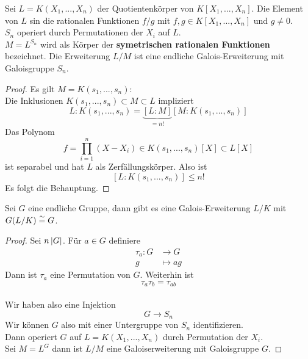 	\begin{definition}
		Sei $L=K(X_1,...,X_n)$ der Quotientenkörper von $K[X_1,...,X_n]$. Die Element von $L$ sin die rationalen Funktionen $f/g$ mit $f,g\in K[X_1,...,X_n]$ und $g\neq 0$.\\
		$S_n$ operiert durch Permutationen der $X_i$ auf $L$.\\
		$M=L^{S_n}$ wird als Körper der \textbf{symetrischen rationalen Funktionen} bezeichnet.
		Die Erweiterung $L/M$ ist eine endliche Galois-Erweiterung mit Galoisgruppe $S_n$.
	\end{definition}
	\begin{proof}
		Es gilt $M=K(s_1,...,s_n)$:\\
		Die Inklusionen $K(s_1,...,s_n)\subset M\subset L$ impliziert
		\[L:K(s_1,...,s_n)=\underbrace{[L:M]}_{=n!}[M:K(s_1,...,s_n)]\]
		Das Polynom
		\[f=\prod_{i=1}^{n}(X-X_i)\in K(s_1,...,s_n)[X]\subset L[X]\]
		ist separabel und hat $L$ als Zerfällungskörper. Also ist
		\[[L:K(s_1,...,s_n)]\leq n!\]
		Es folgt die Behauptung.
	\end{proof}
	
	\begin{satz}
		Sei $G$ eine endliche Gruppe, dann gibt es eine Galois-Erweiterung $L/K$ mit $G(L/K)\overset{\sim}{=} G$.
	\end{satz}
	\begin{proof}
		Sei $n\left|G\right|$. Für $a\in G$ definiere
		\begin{align*}
		\tau_a:G&\to G\\
		g&\mapsto ag
		\end{align*}
		Dann ist $\tau_a$ eine Permutation von $G$. Weiterhin ist
		\[\tau_{a}\tau_b=\tau_{ab}\]\\
		Wir haben also eine Injektion
		\[G\to S_n\]
		Wir können $G$ also mit einer Untergruppe von $S_n$ identifizieren.\\
		Dann operiert $G$ auf $L=K(X_1,...,X_n)$ durch Permutation der $X_i$.\\
		Sei $M=L^G$ dann ist $L/M$ eine Galoiserweiterung mit Galoisgruppe $G$.
	\end{proof}
	
	
	
	

